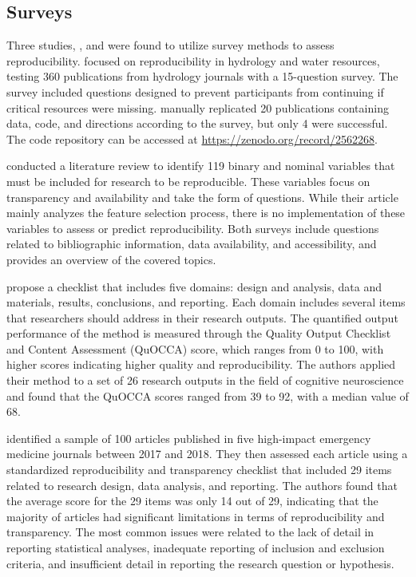 \documentclass[12pt, a4paper, twocolumn]{article}
\begin{document}
	\subsection{Surveys}
	Three studies,  \citet{stagge2019assessing},  \citet{mcintosh2017repeat} and \citet{QualityOutputChecklist} were found to utilize survey methods to assess reproducibility. \citet{stagge2019assessing} focused on reproducibility in hydrology and water resources, testing 360 publications from hydrology journals with a 15-question survey. The survey included questions designed to prevent participants from continuing if critical resources were missing. \citet{stagge2019assessing} manually replicated 20 publications containing data, code, and directions according to the survey, but only 4 were successful. The code repository can be accessed at \url{https://zenodo.org/record/2562268}.
	
	\citet{mcintosh2017repeat} conducted a literature review to identify 119 binary and nominal variables that must be included for research to be reproducible. These variables focus on transparency and availability and take the form of questions. While their article mainly analyzes the feature selection process, there is no implementation of these variables to assess or predict reproducibility. Both surveys include questions related to bibliographic information, data availability, and accessibility, and  provides an overview of the covered topics.
	
	\citet{QualityOutputChecklist} propose a checklist that includes five domains: design and analysis, data and materials, results, conclusions, and reporting. Each domain includes several items that researchers should address in their research outputs. The quantified output performance of the method is measured through the Quality Output Checklist and Content Assessment (QuOCCA) score, which ranges from 0 to 100, with higher scores indicating higher quality and reproducibility. The authors applied their method to a set of 26 research outputs in the field of cognitive neuroscience and found that the QuOCCA scores ranged from 39 to 92, with a median value of 68.

	\citet{Johnson2021Evaluating} identified a sample of 100 articles published in five high-impact emergency medicine journals between 2017 and 2018. They then assessed each article using a standardized reproducibility and transparency checklist that included 29 items related to research design, data analysis, and reporting. The authors found that the average score for the 29 items was only 14 out of 29, indicating that the majority of articles had significant limitations in terms of reproducibility and transparency. The most common issues were related to the lack of detail in reporting statistical analyses, inadequate reporting of inclusion and exclusion criteria, and insufficient detail in reporting the research question or hypothesis.
\end{document}
